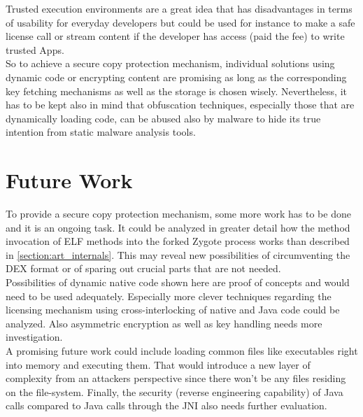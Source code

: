 Trusted execution environments are a great idea that has disadvantages
in terms of usability for everyday developers but could be used for instance
to make a safe license call or stream content if the developer
has access (paid the fee) to write trusted Apps.\\

So to achieve a secure copy protection mechanism, individual solutions
using dynamic code or encrypting content are promising as long as the
corresponding key fetching mechanisms as well as the storage is chosen wisely.
Nevertheless, it has to  be kept also in mind that obfuscation techniques, especially those that are dynamically loading code, can be abused also by malware to hide its true intention from static malware analysis tools.

\section{Future Work}\label{section:future_work}
To provide a secure copy protection mechanism, some more work has to
be done and it is an ongoing task. It could be analyzed in greater detail
how the method invocation of ELF methods into the forked Zygote process works than described in \autoref{section:art_internals}. This may reveal new possibilities of circumventing
the DEX format or of sparing out crucial parts that are not needed.\\

Possibilities of dynamic native code shown here are proof of concepts and would need to be
used adequately. Especially more clever techniques regarding
the licensing mechanism using cross-interlocking of native and Java code could be analyzed.
Also asymmetric encryption as well as key handling needs more investigation.\\

A promising future work could include loading common files
like executables right into memory and executing them. That would introduce
a new layer of complexity from an attackers perspective since there won't be
any files residing on the file-system. Finally, the security (reverse engineering capability) of Java calls compared to Java calls through the JNI also needs further evaluation.
